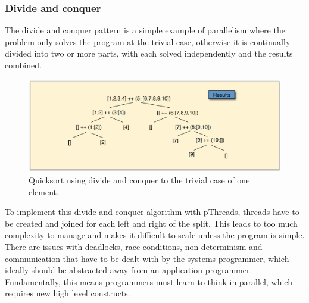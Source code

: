 \documentclass[CS4204-Notes.tex]{subfiles}
\begin{document}
\subsubsection{Divide and conquer}
The divide and conquer pattern is a simple example of parallelism where the problem only solves the program at the trivial case, otherwise it is continually divided into two or more parts, with each solved independently and the results combined. 
\begin{figure}[H]
\centering
\includegraphics[width=1\textwidth, keepaspectratio]{imgs/divide-and-conquer.png}
\caption{Quicksort using divide and conquer to the trivial case of one element.}
\end{figure}
\noindent
To implement this divide and conquer algorithm with pThreads, threads have to be created and joined for each left and right of the split. This leads to too much complexity to manage and makes it difficult to scale unless the program is simple. There are issues with deadlocks, race conditions, non-determinism and communication that have to be dealt with by the systems programmer, which ideally should be abstracted away from an application programmer. Fundamentally, this means programmers must learn to think in parallel, which requires new high level constructs. 
\end{document}
